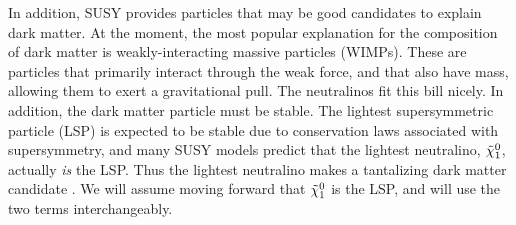 In addition, SUSY provides particles that may be good candidates to
explain dark matter. At the moment, the most popular explanation for
the composition of dark matter is weakly-interacting massive particles
(WIMPs). These are particles that primarily interact through the weak
force, and that also have mass, allowing them to exert a gravitational
pull. The neutralinos fit this bill nicely. In addition, the dark
matter particle must be stable. The lightest supersymmetric particle
(LSP) is expected to be stable due to conservation laws associated
with supersymmetry, and many SUSY models predict that the lightest
neutralino, $\tilde{\chi}^0_1$, actually \emph{is} the LSP. Thus the lightest
neutralino makes a tantalizing dark matter candidate
\cite{susyprimer}. We will assume moving forward that $\tilde{\chi}^0_1$ is the
LSP, and will use the two terms interchangeably.

